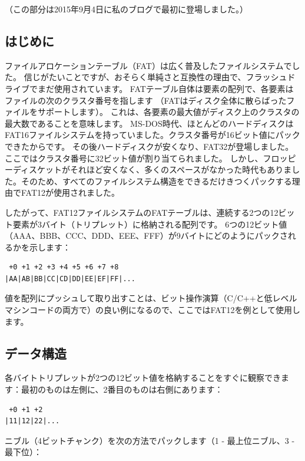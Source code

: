 
（この部分は2015年9月4日に私のブログで最初に登場しました。）

\subsection{はじめに}

ファイルアロケーションテーブル（FAT）は広く普及したファイルシステムでした。
信じがたいことですが、おそらく単純さと互換性の理由で、フラッシュドライブでまだ使用されています。
FATテーブル自体は要素の配列で、各要素はファイルの次のクラスタ番号を指します
（FATはディスク全体に散らばったファイルをサポートします）。
これは、各要素の最大値がディスク上のクラスタの最大数であることを意味します。
MS-DOS時代、ほとんどのハードディスクはFAT16ファイルシステムを持っていました。クラスタ番号が16ビット値にパックできたからです。
その後ハードディスクが安くなり、FAT32が登場しました。ここではクラスタ番号に32ビット値が割り当てられました。
しかし、フロッピーディスケットがそれほど安くなく、多くのスペースがなかった時代もありました。そのため、すべてのファイルシステム構造をできるだけきつくパックする理由でFAT12が使用されました。

したがって、FAT12ファイルシステムのFATテーブルは、連続する2つの12ビット要素が3バイト（トリプレット）に格納される配列です。
6つの12ビット値（AAA、BBB、CCC、DDD、EEE、FFF）が9バイトにどのようにパックされるかを示します：

\begin{lstlisting}
 +0 +1 +2 +3 +4 +5 +6 +7 +8
|AA|AB|BB|CC|CD|DD|EE|EF|FF|...
\end{lstlisting}

値を配列にプッシュして取り出すことは、ビット操作演算（C/C++と低レベルマシンコードの両方で）の良い例になるので、ここではFAT12を例として使用します。

\subsection{データ構造}

各バイトトリプレットが2つの12ビット値を格納することをすぐに観察できます：最初のものは左側に、2番目のものは右側にあります：

\begin{lstlisting}
 +0 +1 +2
|11|12|22|...
\end{lstlisting}

ニブル（4ビットチャンク）を次の方法でパックします（1 - 最上位ニブル、3 - 最下位）：

